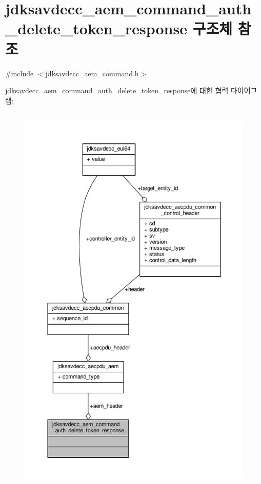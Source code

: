 \hypertarget{structjdksavdecc__aem__command__auth__delete__token__response}{}\section{jdksavdecc\+\_\+aem\+\_\+command\+\_\+auth\+\_\+delete\+\_\+token\+\_\+response 구조체 참조}
\label{structjdksavdecc__aem__command__auth__delete__token__response}


{\ttfamily \#include $<$jdksavdecc\+\_\+aem\+\_\+command.\+h$>$}



jdksavdecc\+\_\+aem\+\_\+command\+\_\+auth\+\_\+delete\+\_\+token\+\_\+response에 대한 협력 다이어그램\+:
\nopagebreak
\begin{figure}[H]
\begin{center}
\leavevmode
\includegraphics[height=550pt]{structjdksavdecc__aem__command__auth__delete__token__response__coll__graph}
\end{center}
\end{figure}
